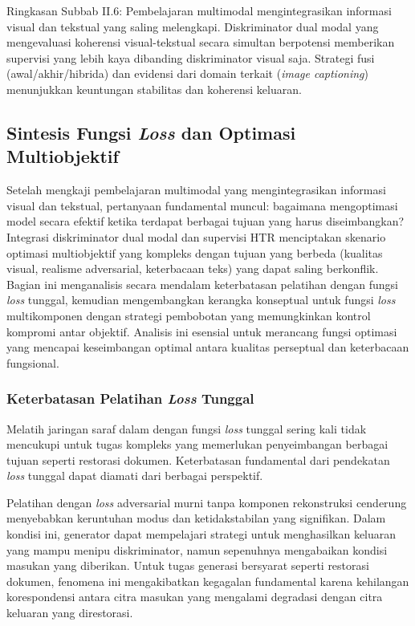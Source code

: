 \documentclass[12pt,a4paper]{article}
\begin{document}
Ringkasan Subbab II.6: Pembelajaran multimodal mengintegrasikan informasi visual dan tekstual yang saling melengkapi. Diskriminator dual modal yang mengevaluasi koherensi visual-tekstual secara simultan berpotensi memberikan supervisi yang lebih kaya dibanding diskriminator visual saja. Strategi fusi (awal/akhir/hibrida) dan evidensi dari domain terkait (\textit{image captioning}) menunjukkan keuntungan stabilitas dan koherensi keluaran.


\subsection{Sintesis Fungsi \textit{Loss} dan Optimasi Multiobjektif}
\label{subsec:loss-functions}

Setelah mengkaji pembelajaran multimodal yang mengintegrasikan informasi visual dan tekstual, pertanyaan fundamental muncul: bagaimana mengoptimasi model secara efektif ketika terdapat berbagai tujuan yang harus diseimbangkan? Integrasi diskriminator dual modal dan supervisi HTR menciptakan skenario optimasi multiobjektif yang kompleks dengan tujuan yang berbeda (kualitas visual, realisme adversarial, keterbacaan teks) yang dapat saling berkonflik. Bagian ini menganalisis secara mendalam keterbatasan pelatihan dengan fungsi \textit{loss} tunggal, kemudian mengembangkan kerangka konseptual untuk fungsi \textit{loss} multikomponen dengan strategi pembobotan yang memungkinkan kontrol kompromi antar objektif. Analisis ini esensial untuk merancang fungsi optimasi yang mencapai keseimbangan optimal antara kualitas perseptual dan keterbacaan fungsional.

\subsubsection{Keterbatasan Pelatihan \textit{Loss} Tunggal}
\label{subsubsec:single-loss-limits}

Melatih jaringan saraf dalam dengan fungsi \textit{loss} tunggal sering kali tidak mencukupi untuk tugas kompleks yang memerlukan penyeimbangan berbagai tujuan seperti restorasi dokumen. Keterbatasan fundamental dari pendekatan \textit{loss} tunggal dapat diamati dari berbagai perspektif.

Pelatihan dengan \textit{loss} adversarial murni tanpa komponen rekonstruksi cenderung menyebabkan keruntuhan modus dan ketidakstabilan yang signifikan. Dalam kondisi ini, generator dapat mempelajari strategi untuk menghasilkan keluaran yang mampu menipu diskriminator, namun sepenuhnya mengabaikan kondisi masukan yang diberikan. Untuk tugas generasi bersyarat seperti restorasi dokumen, fenomena ini mengakibatkan kegagalan fundamental karena kehilangan korespondensi antara citra masukan yang mengalami degradasi dengan citra keluaran yang direstorasi.
\end{document}
